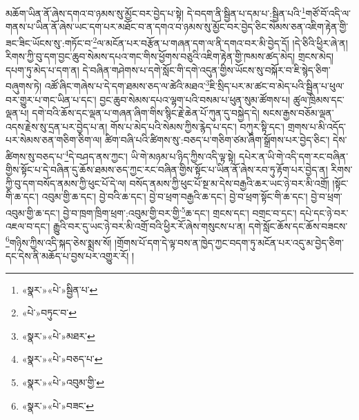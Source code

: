 མཆོག་ཡིན་ནོ་ཞེས་དགའ་བ་ཉམས་སུ་མྱོང་བར་བྱེད་པ་སྟེ། དེ་བདག་ནི་སྦྱིན་པ་དམ་པ་:སྦྱིན་པའི་\footnote{«སྣར་»«པེ་»སྦྱིན་པ་}གཙོ་བོ་འདི་ལ་གནས་པ་ཡིན་ནོ་ཞེས་ཡང་དག་པར་མཐོང་བ་ན་དགའ་བ་ཉམས་སུ་མྱོང་བར་བྱེད་ཅིང་སེམས་ཅན་འཇིག་རྟེན་གྱི་ཟང་ཟིང་ཡོངས་སུ་:གཏོང་བ་\footnote{«པེ་»བཏུང་བ་}ལ་མངོན་པར་བརྩོན་པ་གཞན་དག་ལ་ནི་དགའ་བར་མི་བྱེད་དོ། །དེ་ཅིའི་ཕྱིར་ཞེ་ན། རིགས་ཀྱི་བུ་དག་བྱང་ཆུབ་སེམས་དཔའ་གང་གིས་ཕྱོགས་བཅུའི་འཇིག་རྟེན་གྱི་ཁམས་ཚད་མེད། གྲངས་མེད། དཔག་ཏུ་མེད་པ་དག་ན། དེ་བཞིན་གཤེགས་པ་དགེ་སློང་གི་དགེ་འདུན་གྱིས་ཡོངས་སུ་བསྐོར་བ་ཇི་སྙེད་ཅིག་བཞུགས་ཏེ། འཚོ་ཞིང་གཞེས་པ་དེ་དག་ཐམས་ཅད་ལ་ཚེའི་མཐའ་\footnote{«སྣར་»«པེ་»མཐར་}ཇི་སྲིད་པར་མ་ཚང་བ་མེད་པའི་སྦྱིན་པ་ཕུལ་བར་གྱུར་པ་གང་ཡིན་པ་དང་། བྱང་ཆུབ་སེམས་དཔའ་ལྷག་པའི་བསམ་པ་ཕུན་སུམ་ཚོགས་པ། ཚུལ་ཁྲིམས་དང་ལྡན་པ། དགེ་བའི་ཆོས་དང་ལྡན་པ་གཞན་ཞིག་གིས་སྙིང་རྗེ་ཆེན་པོ་ཀུན་དུ་བསྐྱེད་དེ། སངས་རྒྱས་བཅོམ་ལྡན་འདས་རྗེས་སུ་དྲན་པར་བྱེད་པ་ན། གོས་པ་མེད་པའི་སེམས་ཀྱིས་རྙེད་པ་དང་། བཀུར་སྟི་དང་། གྲགས་པ་མི་འདོད་པར་སེམས་ཅན་གཅིག་ཅིག་ལ། ཚིག་བཞི་པའི་ཚིགས་སུ་:བཅད་པ་གཅིག་ཙམ་ཞིག་སྒྲོགས་པར་བྱེད་ཅིང་། དེས་ཚིགས་སུ་བཅད་པ་\footnote{«སྣར་»«པེ་»བཅད་པ་}དེ་བཤད་ནས་ཀྱང་། ཡི་གེ་མཉམ་པ་ཉིད་ཀྱིས་འདི་ལྟ་སྟེ། དཔེར་ན་ཡི་གེ་འདི་དག་རང་བཞིན་གྱིས་སྟོང་པ་དེ་བཞིན་དུ་ཆོས་ཐམས་ཅད་ཀྱང་རང་བཞིན་གྱིས་སྟོང་པ་ཡིན་ནོ་ཞེས་རབ་ཏུ་རྟོག་པར་བྱེད་ན། རིགས་ཀྱི་བུ་དག་བསོད་ནམས་ཀྱི་ཕུང་པོ་དེ་ལ། བསོད་ནམས་ཀྱི་ཕུང་པོ་སྔ་མ་དེས་བརྒྱའི་ཆར་ཡང་ཉེ་བར་མི་འགྲོ། །སྟོང་གི་ཆ་དང་། འབུམ་གྱི་ཆ་དང་། བྱེ་བའི་ཆ་དང་། བྱེ་བ་ཕྲག་བརྒྱའི་ཆ་དང་། བྱེ་བ་ཕྲག་སྟོང་གི་ཆ་དང་། བྱེ་བ་ཕྲག་འབུམ་གྱི་ཆ་དང་། བྱེ་བ་ཁྲག་ཁྲིག་ཕྲག་:འབུམ་གྱི་བར་གྱི་\footnote{«སྣར་»«པེ་»འབུམ་གྱི་}ཆ་དང་། གྲངས་དང་། བགྲང་བ་དང་། དཔེ་དང་ཉེ་བར་འཇལ་བ་དང་། རྒྱུའི་བར་དུ་ཡང་ཉེ་བར་མི་འགྲོ་བའི་ཕྱིར་རོ་ཞེས་གསུངས་པ་ན། དགེ་སློང་ཆོས་དང་ཆོས་བཟངས་\footnote{«སྣར་»«པེ་»བཟང་}གཉིས་ཀྱིས་འདི་སྐད་ཅེས་སྨྲས་སོ། །གྲོགས་པོ་དག་དེ་ལྟ་བས་ན་ཁྱེད་ཀྱང་བདག་ཏུ་མངོན་པར་འདུ་མ་བྱེད་ཅིག་དང་དེས་ནི་མཆོད་པ་བྱས་པར་འགྱུར་རོ། །
